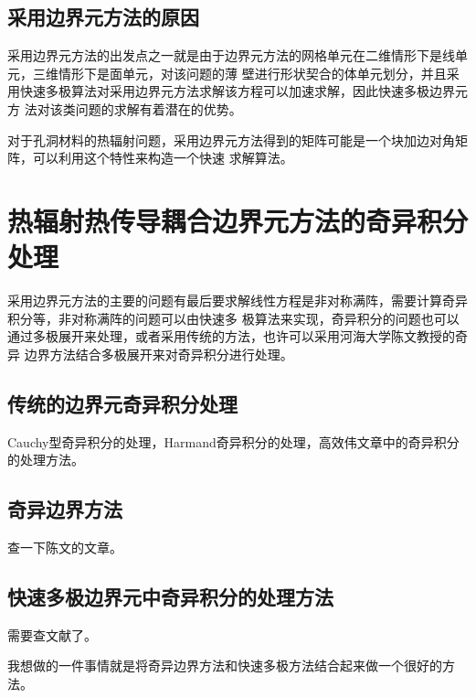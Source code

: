 \subsection{采用边界元方法的原因}
采用边界元方法的出发点之一就是由于边界元方法的网格单元在二维情形下是线单元，三维情形下是面单元，对该问题的薄
壁进行形状契合的体单元划分，并且采用快速多极算法对采用边界元方法求解该方程可以加速求解，因此快速多极边界元方
法对该类问题的求解有着潜在的优势。
\begin{remark}
	对于孔洞材料的热辐射问题，采用边界元方法得到的矩阵可能是一个块加边对角矩阵，可以利用这个特性来构造一个快速
	求解算法。
\end{remark}
\section{热辐射热传导耦合边界元方法的奇异积分处理}
采用边界元方法的主要的问题有最后要求解线性方程是非对称满阵，需要计算奇异积分等，非对称满阵的问题可以由快速多
极算法来实现，奇异积分的问题也可以通过多极展开来处理，或者采用传统的方法，也许可以采用河海大学陈文教授的奇异
边界方法结合多极展开来对奇异积分进行处理。

\subsection{传统的边界元奇异积分处理}
Cauchy型奇异积分的处理，Harmand奇异积分的处理，高效伟文章中的奇异积分的处理方法。
\subsection{奇异边界方法}
查一下陈文的文章。
\subsection{快速多极边界元中奇异积分的处理方法}
需要查文献了。

\begin{think}
	我想做的一件事情就是将奇异边界方法和快速多极方法结合起来做一个很好的方法。
\end{think}
